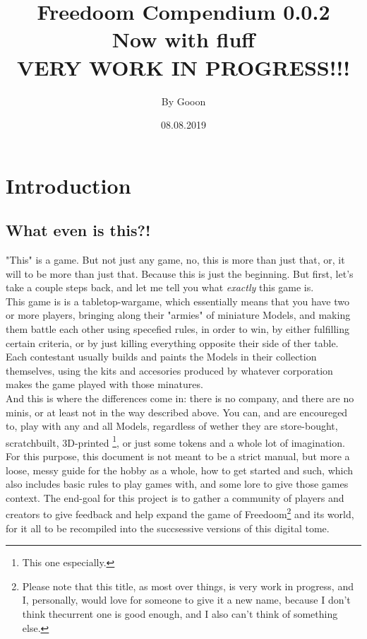 \documentclass[a4paper,14pt]{book}
\begin{document}
\title{\Large{\textbf{Freedoom Compendium 0.0.2\\ Now with fluff\\ VERY WORK IN PROGRESS!!!}}}
\author{By Gooon}
\date{08.08.2019}

\maketitle
\let\cleardoublepage\clearpage
\tableofcontents
\pagebreak

\chapter{Introduction}
\section{What even is this?!}
"This" is a game. But not just any game, no, this is more than just that, or,  it will to be more than just that. Because this is just the beginning. But first, let's take a couple steps back, and let me tell you what \textit{exactly} this game is. \\
This game is is a tabletop-wargame, which essentially means that you have two or more players, bringing along their "armies" of miniature Models, and making them battle each other using specefied rules, in order to win, by either fulfilling certain criteria, or by just killing everything opposite their side of ther table. Each contestant usually builds and paints the Models in their collection themselves, using the kits and accesories produced by whatever corporation makes the game played with those minatures. \\
And this is where the differences come in: there is no company, and there are no minis, or at least not in the way described above. You can, and are encoureged to, play with any and all Models, regardless of wether they are store-bought, scratchbuilt, 3D-printed \footnote{This one especially.}, or just some tokens and a whole lot of imagination. For this purpose, this document is not meant to be a strict manual, but more a loose, messy guide for the hobby as a whole, how to get started and such, which also includes basic rules to play games with, and some lore to give those games context. The end-goal for this project is to gather a community of players and creators to give feedback and help expand the game of Freedoom\footnote{Please note that this title, as most over things, is very work in progress, and I, personally, would love for someone to give it a new name, because I don't think thecurrent one is good enough, and I also can't think of something else.} and its world, for it all to be recompiled into the succsessive versions of this digital tome.
\end{document}

